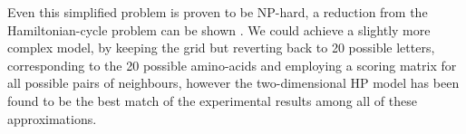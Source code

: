 Even this simplified problem is proven to be NP-hard, a reduction from the Hamiltonian-cycle problem can be shown \cite{crescenzi_complexity_1998}. We could achieve a slightly more complex model, by keeping the grid but reverting back to 20 possible letters, corresponding to the 20 possible amino-acids and employing a scoring matrix for all possible pairs of neighbours, however the two-dimensional HP model has been found to be the best match of the experimental results among all of these approximations. \cite{crescenzi_complexity_1998}

